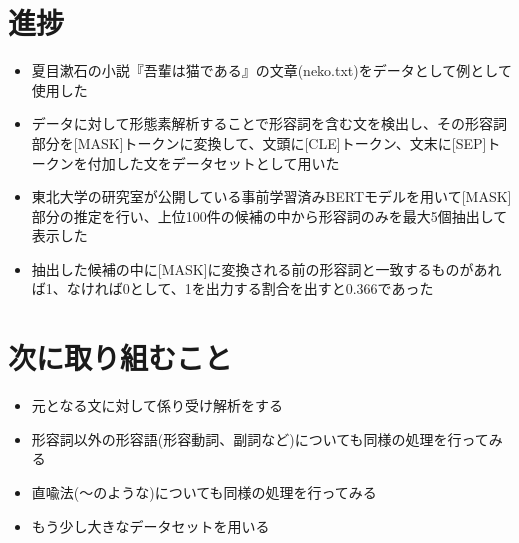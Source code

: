 \documentclass[twocolumn]{jsarticle}     %
\begin{document}


\section{進捗}
\begin{itemize}
\item 夏目漱石の小説『吾輩は猫である』の文章(neko.txt)をデータとして例として使用した
\item データに対して形態素解析することで形容詞を含む文を検出し、その形容詞部分を[MASK]トークンに変換して、文頭に[CLE]トークン、文末に[SEP]トークンを付加した文をデータセットとして用いた
\item 東北大学の研究室が公開している事前学習済みBERTモデルを用いて[MASK]部分の推定を行い、上位100件の候補の中から形容詞のみを最大5個抽出して表示した
\item 抽出した候補の中に[MASK]に変換される前の形容詞と一致するものがあれば1、なければ0として、1を出力する割合を出すと0.366であった 
\end{itemize}

\section{次に取り組むこと}
\begin{itemize}
\item 元となる文に対して係り受け解析をする
\item 形容詞以外の形容語(形容動詞、副詞など)についても同様の処理を行ってみる
\item 直喩法(〜のような)についても同様の処理を行ってみる
\item もう少し大きなデータセットを用いる
\end{itemize}

\nocite{*}

\end{document}
